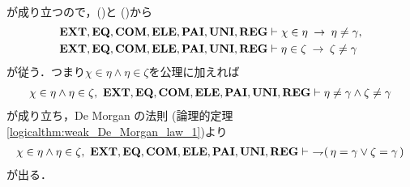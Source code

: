 \begin{sketch}
\begin{description}
\begin{align}
				\end{align}
				が成り立つので，()と
				()から
				\begin{align}
					\mbox{{\bf EXT}},\mbox{{\bf EQ}},\mbox{\bf COM},\mbox{{\bf ELE}},\mbox{{\bf PAI}},\mbox{{\bf UNI}},\mbox{{\bf REG}} &\vdash 
					\chi \in \eta \hspace{0.25em}\rightarrow\hspace{0.25em} \eta \neq \gamma, 
					\label{fom:no_three_sets_go_round_17} \\
					\mbox{{\bf EXT}},\mbox{{\bf EQ}},\mbox{\bf COM},\mbox{{\bf ELE}},\mbox{{\bf PAI}},\mbox{{\bf UNI}},\mbox{{\bf REG}} &\vdash 
					\eta \in \zeta \hspace{0.25em}\rightarrow\hspace{0.25em} \zeta \neq \gamma
					\label{fom:no_three_sets_go_round_18}
				\end{align}
				が従う．つまり$\chi \in \eta \wedge \eta \in \zeta$を公理に加えれば
				\begin{align}
					\chi \in \eta \wedge \eta \in \zeta,\ 
					\EXTAX,\EQAX,\COMAX,\ELEAX,\PAIAX,\UNIAX,\REGAX \vdash \eta \neq \gamma \wedge \zeta \neq \gamma
				\end{align}
				が成り立ち，De Morgan の法則
				(論理的定理\ref{logicalthm:weak_De_Morgan_law_1})より
				\begin{align}
					\chi \in \eta \wedge \eta \in \zeta,\ 
					\EXTAX,\EQAX,\COMAX,\ELEAX,\PAIAX,\UNIAX,\REGAX \vdash\ 
					\negation (\, \eta = \gamma \vee \zeta = \gamma\, )
					\label{fom:no_three_sets_go_round_19}
				\end{align}
				が出る．
				

\end{description}
\end{sketch}
